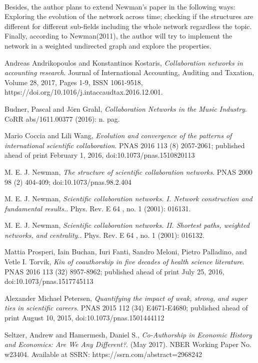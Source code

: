 \documentclass[12pt]{article}
\begin{document}
\paragraph{}
Besides, the author plans to extend Newman's paper in the following ways: Exploring the evolution of the network across time; checking if the structures are different for different sub-fields including the whole network regardless the topic. Finally, according to Newman(2011), the author will try to implement the network in a weighted undirected graph and explore the properties. 
\pagebreak


\begin{thebibliography}{56}


 Andreas Andrikopoulos and Konstantinos Kostaris,
  \emph{Collaboration networks in accounting research}.
	Journal of International Accounting, Auditing and Taxation, Volume 28, 2017, Pages 1-9, ISSN 1061-9518, https://doi.org/10.1016/j.intaccaudtax.2016.12.001.
	
Budner, Pascal and Jörn Grahl,
\emph{Collaboration Networks in the Music Industry}.
CoRR abs/1611.00377 (2016): n. pag.

Mario Coccia and Lili Wang,
\emph{Evolution and convergence of the patterns of international scientific collaboration}.
PNAS 2016 113 (8) 2057-2061; published ahead of print February 1, 2016, doi:10.1073/pnas.1510820113

 M. E. J. Newman,
 \emph{The structure of scientific collaboration networks}.
 PNAS 2000 98 (2) 404-409; doi:10.1073/pnas.98.2.404

  M. E. J. Newman,
  \emph{Scientific collaboration networks. I. Network construction and fundamental results.}.
  Phys. Rev. E 64 , no. 1 (2001): 016131.

 M. E. J. Newman,
  \emph{Scientific collaboration networks. II. Shortest paths, weighted networks, and centrality.}.
  Phys. Rev. E 64 , no. 1 (2001): 016132.

Mattia Prosperi, Iain Buchan, Iuri Fanti, Sandro Meloni, Pietro Palladino, and Vetle I. Torvik,
\emph{Kin of coauthorship in five decades of health science literature}.
PNAS 2016 113 (32) 8957-8962; published ahead of print July 25, 2016, doi:10.1073/pnas.1517745113


Alexander Michael Petersen,
\emph{Quantifying the impact of weak, strong, and super ties in scientific careers}.
PNAS 2015 112 (34) E4671-E4680; published ahead of print August 10, 2015, doi:10.1073/pnas.1501444112

Seltzer, Andrew and Hamermesh, Daniel S.,
\emph{Co-Authorship in Economic History and Economics: Are We Any Different?}.
(May 2017). NBER Working Paper No. w23404. Available at SSRN: https://ssrn.com/abstract=2968242

\end{thebibliography}
\end{document}
